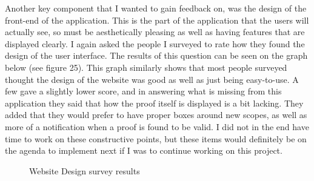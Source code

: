 Another key component that I wanted to gain feedback on, was the design of the front-end of the application. This is the part of the application that the users will actually see, so must be aesthetically pleasing as well as having features that are displayed clearly. I again asked the people I surveyed to rate how they found the design of the user interface. The results of this question can be seen on the graph below (see figure 25). This graph similarly shows that most people surveyed thought the design of the website was good as well as just being easy-to-use. A few gave a slightly lower score, and in answering what is missing from this application they said that how the proof itself is displayed is a bit lacking. They added that they would prefer to have proper boxes around new scopes, as well as more of a notification when a proof is found to be valid. I did not in the end have time to work on these constructive points, but these items would definitely be on the agenda to implement next if I was to continue working on this project. 

\begin{figure}[!ht]
	\centering
	\caption{Website Design survey results}
\end{figure}

